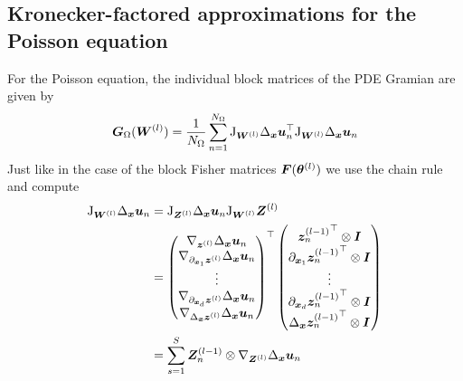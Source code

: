 \subsection{Kronecker-factored approximations for the Poisson equation}
For the Poisson equation, the individual block matrices of the PDE Gramian are given by 
\begin{align}
    {\bm{G}}_\Omega({\bm{W}}^{(l)}) = \frac1{{N_\Omega}} \sum_{n=1}^{N_\Omega} \mathrm{J}_{{\bm{W}}^{(l)}} \Delta_{\bm{x}} {\bm{u}}_n^\top \mathrm{J}_{{\bm{W}}^{(l)}} \Delta_{\bm{x}} {\bm{u}}_n
\end{align}
Just like in the case of the block Fisher matrices ${\bm{F}}({\bm{\theta}}^{(l)})$ we use the chain rule and compute 
\begin{align*}
    \jac_{\mW^{(l)}} \Delta_\vx \vu_n & = \jac_{\mZ^{(l)}}\Delta_\vx \vu_n \jac_{\mW^{(l)}} \mZ^{(l)} %
    \\ & = 
    \begin{pmatrix}
        \nabla_{\vz^{(l)}} \Delta_{\vx}\vu_n \\ 
        \nabla_{\partial_{\vx_1}\vz^{(l)}}\Delta_{\vx}\vu_n \\ 
        \vdots \\ 
        \nabla_{\partial_{\vx_d}\vz^{(l)}} \Delta_{\vx}\vu_n  \\ 
        \nabla_{\Delta_{\vx}\vz^{(l)}} \Delta_{\vx}\vu_n \\ 
    \end{pmatrix}^\top
    \begin{pmatrix}
        {\vz^{(l-1)}_n}^\top \otimes \mI \\ 
        {\partial_{\vx_1}\vz^{(l-1)}_n}^\top \otimes \mI \\ 
        \vdots \\ 
        {\partial_{\vx_d}\vz^{(l-1)}_n}^\top \otimes \mI \\ 
        {\Delta_{\vx}\vz^{(l-1)}_n}^\top \otimes \mI \\ 
    \end{pmatrix}
    \\ & = \sum_{s=1}^S \mZ^{(l-1)}_n \otimes \nabla_{\mZ^{(l)}} \Delta_{\vx}\vu_n 
\end{align*}
